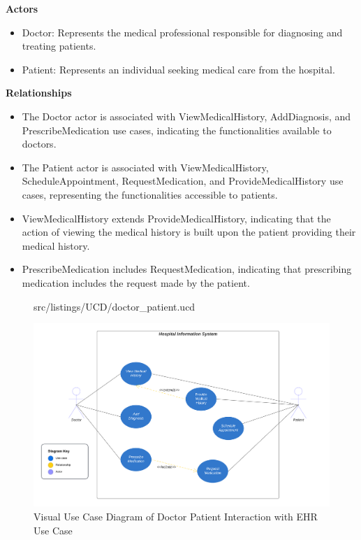 \textbf{Actors}
\begin{itemize}
    \item Doctor: Represents the medical professional responsible for diagnosing and treating patients.
    \item Patient: Represents an individual seeking medical care from the hospital.
\end{itemize}

\textbf{Relationships}
\begin{itemize}
    \item The Doctor actor is associated with ViewMedicalHistory, AddDiagnosis, and PrescribeMedication use cases, indicating the functionalities available to doctors.
    \item The Patient actor is associated with ViewMedicalHistory, ScheduleAppointment, RequestMedication, and ProvideMedicalHistory use cases, representing the functionalities accessible to patients.
    \item ViewMedicalHistory extends ProvideMedicalHistory, indicating that the action of viewing the medical history is built upon the patient providing their medical history.
    \item PrescribeMedication includes RequestMedication, indicating that prescribing medication includes the request made by the patient.
\end{itemize}

\begin{figure}[!htb]
\lstset{language=MontiArc}
 {src/listings/UCD/doctor_patient.ucd}
\end{figure}



\begin{figure}[!htb]
\begin{center}\includegraphics[width=12cm]{src/pic/Diagrams/EHR_Doctor_Patient_UCD.png}\end{center}
\caption{Visual Use Case Diagram of Doctor Patient Interaction with EHR Use Case}
\label{dopaUCD}
\end{figure}

